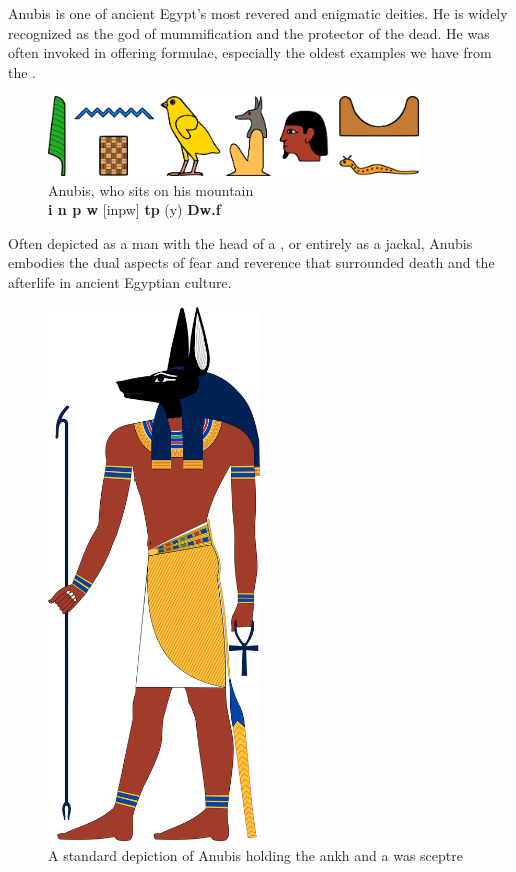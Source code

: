 Anubis is one of ancient Egypt's most revered and enigmatic deities. He is widely recognized as the god of mummification and the protector of the dead. He was often invoked in offering formulae, especially the oldest examples we have from the .

\begin{figure} [H]
	\centering
	\includegraphics[width=0.875\textwidth]{../images/inpw-tpy-dwf}
	\caption{Anubis, who sits on his mountain\\\textbf{i n p w} [inpw] \textbf{tp} (y) \textbf{Dw.f}}
\end{figure}

Often depicted as a man with the head of a , or entirely as a jackal, Anubis embodies the dual aspects of fear and reverence that surrounded death and the afterlife in ancient Egyptian culture.

\begin{figure} [H]
	\centering
	\includegraphics[width=0.5\textwidth]{../images/anubis}
	\caption{A standard depiction of Anubis holding the ankh and a was sceptre}
\end{figure}


